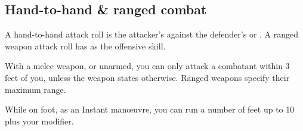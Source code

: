 
\subsection{Hand-to-hand \& ranged combat}
A hand-to-hand attack roll is the attacker's  against the defender's  or . A ranged weapon attack roll has  as the offensive skill.

With a melee weapon, or unarmed, you can only attack a combatant within 3 feet of you, unless the weapon states otherwise. Ranged weapons specify their maximum range.

While on foot, as an Instant man\oe{}uvre, you can run a number of feet up to 10 plus your  modifier.
